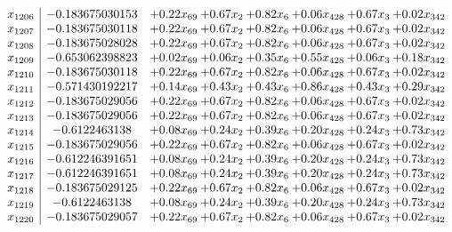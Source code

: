 \documentclass[8pt]{article}
\begin{document}
\[\begin{array}{c| c c@{\hskip 2pt} c@{\hskip 2pt} c@{\hskip 2pt} c@{\hskip 2pt} c@{\hskip 2pt} c@{\hskip 2pt} }
 x_{1206}   &  -0.183675030153 & +  0.22 x_{69} & +  0.67 x_{2} & +  0.82 x_{6} & +  0.06 x_{428} & +  0.67 x_{3} & +  0.02 x_{342}\\
 x_{1207}   &  -0.183675030118 & +  0.22 x_{69} & +  0.67 x_{2} & +  0.82 x_{6} & +  0.06 x_{428} & +  0.67 x_{3} & +  0.02 x_{342}\\
 x_{1208}   &  -0.183675028028 & +  0.22 x_{69} & +  0.67 x_{2} & +  0.82 x_{6} & +  0.06 x_{428} & +  0.67 x_{3} & +  0.02 x_{342}\\
 x_{1209}   &  -0.653062398823 & +  0.02 x_{69} & +  0.06 x_{2} & +  0.35 x_{6} & +  0.55 x_{428} & +  0.06 x_{3} & +  0.18 x_{342}\\
 x_{1210}   &  -0.183675030118 & +  0.22 x_{69} & +  0.67 x_{2} & +  0.82 x_{6} & +  0.06 x_{428} & +  0.67 x_{3} & +  0.02 x_{342}\\
 x_{1211}   &  -0.571430192217 & +  0.14 x_{69} & +  0.43 x_{2} & +  0.43 x_{6} & +  0.86 x_{428} & +  0.43 x_{3} & +  0.29 x_{342}\\
 x_{1212}   &  -0.183675029056 & +  0.22 x_{69} & +  0.67 x_{2} & +  0.82 x_{6} & +  0.06 x_{428} & +  0.67 x_{3} & +  0.02 x_{342}\\
 x_{1213}   &  -0.183675029056 & +  0.22 x_{69} & +  0.67 x_{2} & +  0.82 x_{6} & +  0.06 x_{428} & +  0.67 x_{3} & +  0.02 x_{342}\\
 x_{1214}   &  -0.6122463138 & +  0.08 x_{69} & +  0.24 x_{2} & +  0.39 x_{6} & +  0.20 x_{428} & +  0.24 x_{3} & +  0.73 x_{342}\\
 x_{1215}   &  -0.183675029056 & +  0.22 x_{69} & +  0.67 x_{2} & +  0.82 x_{6} & +  0.06 x_{428} & +  0.67 x_{3} & +  0.02 x_{342}\\
 x_{1216}   &  -0.612246391651 & +  0.08 x_{69} & +  0.24 x_{2} & +  0.39 x_{6} & +  0.20 x_{428} & +  0.24 x_{3} & +  0.73 x_{342}\\
 x_{1217}   &  -0.612246391651 & +  0.08 x_{69} & +  0.24 x_{2} & +  0.39 x_{6} & +  0.20 x_{428} & +  0.24 x_{3} & +  0.73 x_{342}\\
 x_{1218}   &  -0.183675029125 & +  0.22 x_{69} & +  0.67 x_{2} & +  0.82 x_{6} & +  0.06 x_{428} & +  0.67 x_{3} & +  0.02 x_{342}\\
 x_{1219}   &  -0.6122463138 & +  0.08 x_{69} & +  0.24 x_{2} & +  0.39 x_{6} & +  0.20 x_{428} & +  0.24 x_{3} & +  0.73 x_{342}\\
 x_{1220}   &  -0.183675029057 & +  0.22 x_{69} & +  0.67 x_{2} & +  0.82 x_{6} & +  0.06 x_{428} & +  0.67 x_{3} & +  0.02 x_{342}\\

\end{array}\]
\end{document}
